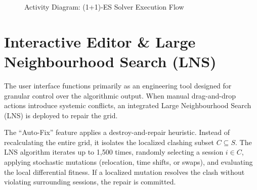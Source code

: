 \begin{figure}[H]
\begin{tikzpicture}
\end{tikzpicture}
\caption{Activity Diagram: (1+1)-ES Solver Execution Flow}
\label{fig:solver_activity}
\end{figure}

\section{Interactive Editor \& Large Neighbourhood Search (LNS)}

The user interface functions primarily as an engineering tool designed for granular control over the algorithmic output. When manual drag-and-drop actions introduce systemic conflicts, an integrated Large Neighbourhood Search (LNS) is deployed to repair the grid.

The ``Auto-Fix'' feature applies a destroy-and-repair heuristic. Instead of recalculating the entire grid, it isolates the localized clashing subset $C \subseteq S$. The LNS algorithm iterates up to 1,500 times, randomly selecting a session $i \in C$, applying stochastic mutations (relocation, time shifts, or swaps), and evaluating the local differential fitness. If a localized mutation resolves the clash without violating surrounding sessions, the repair is committed.

